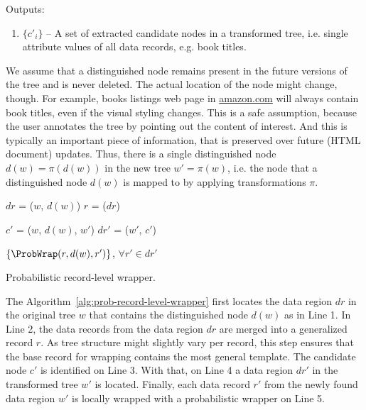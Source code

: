 Outputs: 

\begin{enumerate}
	\item $\{c'_i\}$ -- A set of extracted candidate nodes in a transformed tree, i.e. single attribute values of all data records, e.g. book titles.
\end{enumerate}

We assume that a distinguished node remains present in the future versions of the tree and is never deleted. The actual location of the node might change, though. For example, books listings web page in \url{amazon.com} will always contain book titles, even if the visual styling changes. This is a safe assumption, because the user annotates the tree by pointing out the content of interest. And this is typically an important piece of information, that is preserved over future (HTML document) updates. Thus, there is a single distinguished node $d(w) = \pi(d(w))$ in the new tree $w'=\pi(w)$, i.e. the node that a distinguished node $d(w)$ is mapped to by applying transformations $\pi$.

\IncMargin{2em}
\begin{algorithm}[h]

	\DontPrintSemicolon

	\BlankLine

	$dr$ = \LocateDataRegionContainingNode($w$, $d(w)$) \;
	$r$ = \MergeDataRecords($dr$) \;

	$c'$ = \ProbWrap($w$, $d(w)$, $w'$) \;
	$dr'$ = \LocateDataRegionContainingNode($w'$, $c'$) \;

	\Return $\left\{ \ProbWrap(r, d(w), r') \right\}$, $\forall r' \in dr'$ \;

	\caption{Probabilistic record-level wrapper.}
	\label{alg:prob-record-level-wrapper}

\end{algorithm}
\DecMargin{2em}

The Algorithm~\ref{alg:prob-record-level-wrapper} first locates the data region $dr$ in the original tree $w$ that contains the distinguished node $d(w)$ as in Line 1. In Line 2, the data records from the data region $dr$ are merged into a generalized record $r$. As tree structure might slightly vary per record, this step ensures that the base record for wrapping contains the most general template. The candidate node $c'$ is identified on Line 3. With that, on Line 4 a data region $dr'$ in the transformed tree $w'$ is located. Finally, each data record $r'$ from the newly found data region $w'$ is locally wrapped with a probabilistic wrapper on Line 5.

